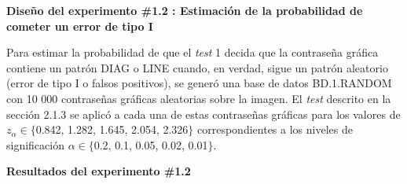 \documentclass[12pt]{report}
\begin{document}
	\textbf{Diseño del experimento \#1.2 : Estimación de la probabilidad de cometer un error de tipo I} 
	
	Para estimar la probabilidad de que el \textit{test} 1 decida que la contraseña gráfica contiene un patrón DIAG o LINE cuando, en verdad, sigue un patrón aleatorio (error de tipo I o falsos positivos), se generó una base de datos BD.1.RANDOM con 10 000 contraseñas gráficas aleatorias sobre la imagen. El \textit{test} descrito en la sección 2.1.3 se aplicó a cada una de estas contraseñas gráficas para los valores de $z_\alpha \in \{$0.842, 1.282, 1.645, 2.054, 2.326$\}$ correspondientes a los niveles de significación $\alpha \in \{$0.2, 0.1, 0.05, 0.02, 0.01$\}$.
	


\textbf{Resultados del experimento \#1.2}
\end{document}
